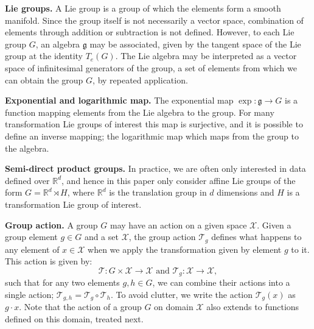 \documentclass[nohyperref]{article}
\theoremstyle{plain}
\theoremstyle{definition}
\theoremstyle{remark}
\newcommand{\R}{\mathbb{R}}
\begin{document}
\textbf{Lie groups.} A Lie group is a group of which the elements form a smooth manifold. Since the group itself is not necessarily a vector space, combination of elements through addition or subtraction is not defined. However, to each Lie group $G$, an algebra $\mathfrak{g}$ may be associated, given by the tangent space of the Lie group at the identity $T_e(G)$. The Lie algebra may be interpreted as a vector space of infinitesimal generators of the group, a set of elements from which we can obtain the group $G$, by repeated application.

\textbf{Exponential and logarithmic map.} The exponential map $\exp:\mathfrak{g} \rightarrow G$ is a function mapping elements from the Lie algebra to the group. For many transformation Lie groups of interest this map is surjective, and it is possible to define an inverse mapping; the logarithmic map which maps from the group to the algebra. 

\textbf{Semi-direct product groups.} In practice, we are often only interested in data defined over $\R^d$, and hence in this paper only consider affine Lie groups of the form $G = \R^d \rtimes H$, where $\R^d$ is the translation group in $d$ dimensions and $H$ is a transformation Lie group of interest.

\textbf{Group action.} A group $G$ may have an action on a given space $\mathcal{X}$. Given a group element $g\in G$ and a set $\mathcal{X}$, the group action $\mathcal{T}_g$ defines what happens to any element of $x\in \mathcal{X}$ when we apply the transformation given by element $g$ to it. This action is given by:
\begin{equation}
    \mathcal{T}: G \times \mathcal{X} \rightarrow \mathcal{X} \text{ and } \mathcal{T}_g: \mathcal{X} \rightarrow \mathcal{X},
\end{equation}
such that for any two elements $g, h \in G$, we can combine their actions into a single action; $\mathcal{T}_{g,h} = \mathcal{T}_g \circ \mathcal{T}_h$. To avoid clutter, we write the action $\mathcal{T}_g(x)$ as $g\cdot x$.
Note that the action of a group $G$ on domain $\mathcal{X}$ also extends to functions defined on this domain, treated next.
\end{document}
